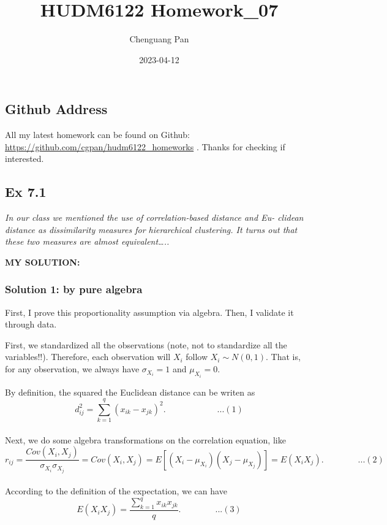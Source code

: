 \documentclass[
]{article}
\title{HUDM6122 Homework\_07}
\author{Chenguang Pan}
\date{2023-04-12}
\begin{document}
\maketitle

\hypertarget{github-address}{%
\subsection{Github Address}\label{github-address}}

All my latest homework can be found on Github:
\url{https://github.com/cgpan/hudm6122_homeworks} . Thanks for checking
if interested.

\hypertarget{ex-7.1}{%
\subsection{Ex 7.1}\label{ex-7.1}}

\emph{In our class we mentioned the use of correlation-based distance
and Eu- clidean distance as dissimilarity measures for hierarchical
clustering. It turns out that these two measures are almost
equivalent\ldots..}

\textbf{MY SOLUTION:}

\hypertarget{solution-1-by-pure-algebra}{%
\subsubsection{Solution 1: by pure
algebra}\label{solution-1-by-pure-algebra}}

First, I prove this proportionality assumption via algebra. Then, I
validate it through data.

First, we standardized all the observations (note, not to standardize
all the variables!!). Therefore, each observation will \(X_i\) follow
\(X_i \sim N(0,1)\). That is, for any observation, we always have
\(\sigma_{X_i}=1\) and \(\mu_{X_i} =0\).

By definition, the squared the Euclidean distance can be writen as
\[d_{ij}^2 = \sum_{k=1}^{q}(x_{ik} - x_{jk})^2.\qquad\qquad \qquad...(1)\]\\
Next, we do some algebra transformations on the correlation equation,
like
\[r_{ij} = \frac{Cov(X_i,X_j)}{\sigma_{X_i}\sigma_{X_j}} =Cov(X_i,X_j)=E[(X_i-\mu_{X_i})(X_j-\mu_{X_j})]=E(X_iX_j).\qquad\qquad ...(2) \]\\
According to the definition of the expectation, we can have
\[E(X_iX_j) = \frac{\sum_{k=1}^{q}x_{ik}x_{jk}}{q}. \qquad\qquad ...(3)\]
\end{document}
